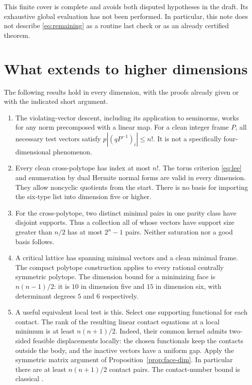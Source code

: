 \documentclass[11pt,reqno]{amsart}
\theoremstyle{definition}
\begin{document}
This finite cover is complete and avoids both disputed hypotheses in
the draft. Its exhaustive global evaluation has not been performed.
In particular, this note does not describe \eqref{eq:remaining} as a
routine last check or as an already certified theorem.

\section{What extends to higher dimensions}\label{sec:higher}
The following results hold in every dimension, with the proofs already
given or with the indicated short argument.
\begin{enumerate}
\item The violating-vector descent, including its application to
seminorms, works for any norm precomposed with a linear map. For a
clean integer frame $P$, all necessary test vectors satisfy
$p|(qP^{-1})_i|\le n!$. It is not a specifically four-dimensional
phenomenon.
\item Every clean cross-polytope has index at most $n!$. The torus
criterion \eqref{eq:lee} and enumeration by dual Hermite normal forms
are valid in every dimension. They allow noncyclic quotients from the
start. There is no basis for importing the six-type list into dimension
five or higher.
\item For the cross-polytope, two distinct minimal pairs in one
parity class have disjoint supports. Thus a collection all of whose
vectors have support size greater than $n/2$ has at most $2^n-1$
pairs. Neither saturation nor a good basis follows.
\item A critical lattice has spanning minimal vectors and a clean
minimal frame. The compact polytope construction applies to every
rational centrally symmetric polytope. The dimension bound for a
minimizing face is $n(n-1)/2$: it is $10$ in dimension five and $15$
in dimension six, with determinant degrees $5$ and $6$ respectively.
\item A useful equivalent local test is this. Select one supporting
functional for each contact. The rank of the resulting linear
contact equations at a local minimum is at least $n(n+1)/2$.
Indeed, their common kernel admits two-sided feasible displacements
locally: the chosen functionals keep the contacts outside the body,
and the inactive vectors have a uniform gap. Apply the symmetric
matrix argument of Proposition~\ref{prop:face-dim}. In particular
there are at least $n(n+1)/2$ contact pairs. The contact-number bound
is classical \cite{SwinnertonDyer}.

\end{enumerate}
\end{document}
